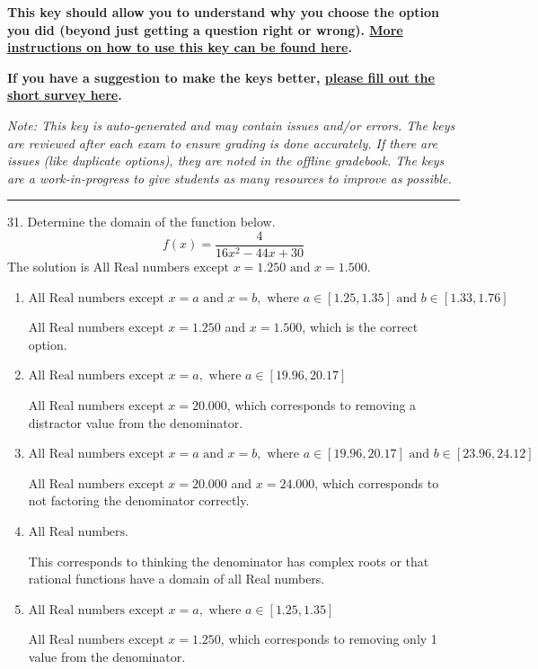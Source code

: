 \documentclass{article}[14pt]
\begin{document}
\textbf{This key should allow you to understand why you choose the option you did (beyond just getting a question right or wrong). \href{https://xronos.clas.ufl.edu/mac1105spring2020/courseDescriptionAndMisc/Exams/LearningFromResults}{More instructions on how to use this key can be found here}.}

\textbf{If you have a suggestion to make the keys better, \href{https://forms.gle/CZkbZmPbC9XALEE88}{please fill out the short survey here}.}

\textit{Note: This key is auto-generated and may contain issues and/or errors. The keys are reviewed after each exam to ensure grading is done accurately. If there are issues (like duplicate options), they are noted in the offline gradebook. The keys are a work-in-progress to give students as many resources to improve as possible.}

\rule{\textwidth}{0.4pt}

31. Determine the domain of the function below.
$$ f(x) = \frac{4}{16x^{2} -44 x + 30} $$ 
The solution is $ \text{All Real numbers except } x = 1.250 \text{ and } x = 1.500. $ 

\begin{enumerate}[label=\Alph*.] 
\item $ \text{All Real numbers except } x = a \text{ and } x = b, \text{ where } a \in [1.25, 1.35] \text{ and } b \in [1.33, 1.76] $ 

 All Real numbers except $x = 1.250$ and $x = 1.500$, which is the correct option. 
\item $ \text{All Real numbers except } x = a, \text{ where } a \in [19.96, 20.17] $ 

 All Real numbers except $x = 20.000$, which corresponds to removing a distractor value from the denominator. 
\item $ \text{All Real numbers except } x = a \text{ and } x = b, \text{ where } a \in [19.96, 20.17] \text{ and } b \in [23.96, 24.12] $ 

 All Real numbers except $x = 20.000$ and $x = 24.000$, which corresponds to not factoring the denominator correctly. 
\item $ \text{All Real numbers.} $ 

 This corresponds to thinking the denominator has complex roots or that rational functions have a domain of all Real numbers. 
\item $ \text{All Real numbers except } x = a, \text{ where } a \in [1.25, 1.35] $ 

 All Real numbers except $x = 1.250$, which corresponds to removing only 1 value from the denominator. 
\end{enumerate} 
 
\end{document}
